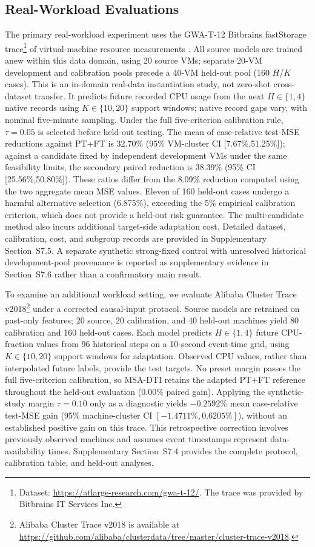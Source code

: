 \documentclass[a4paper,fleqn]{cas-sc}
\begin{document}
\subsection{Real-Workload Evaluations}
\label{subsec:external}

The primary real-workload experiment uses the GWA-T-12 Bitbrains
fastStorage trace\footnote{Dataset: \url{https://atlarge-research.com/gwa-t-12/}.
The trace was provided by Bitbrains IT Services Inc.}
of virtual-machine resource measurements \cite{ref37}.
All source models are trained anew within this data domain, using 20 source
VMs; separate 20-VM development and calibration pools precede a 40-VM
held-out pool (160 $H$/$K$ cases). This is an in-domain real-data
instantiation study, not zero-shot cross-dataset transfer. It predicts
future recorded CPU usage from the next $H\in\{1,4\}$ native records
using $K\in\{10,20\}$ support windows; native record gaps vary, with
nominal five-minute sampling. Under the full five-criterion calibration
rule, $\tau=0.05$ is selected before held-out testing. The mean of
case-relative test-MSE reductions against PT+FT is 32.70\%
(95\% VM-cluster CI [7.67\%,51.25\%]); against a candidate fixed by
independent development VMs under the same feasibility limits, the
secondary paired reduction is 38.39\% (95\% CI [25.56\%,50.80\%]).
These ratios differ from the 8.09\% reduction computed using the two
aggregate mean MSE values. Eleven of 160 held-out cases undergo a harmful
alternative selection (6.875\%), exceeding the 5\% empirical calibration
criterion, which does not provide a held-out risk guarantee.
The multi-candidate method also incurs additional target-side adaptation
cost. Detailed dataset, calibration, cost, and subgroup records are provided
in Supplementary Section~S7.5. A separate synthetic strong-fixed control
with unresolved historical development-pool provenance is reported as
supplementary evidence in Section~S7.6 rather than a confirmatory main result.

To examine an additional workload setting, we evaluate Alibaba Cluster
Trace v2018\footnote{Alibaba Cluster Trace v2018 is available at
\url{https://github.com/alibaba/clusterdata/tree/master/cluster-trace-v2018}.}
under a corrected causal-input protocol. Source models are retrained on
past-only features; 20 source, 20 calibration, and 40 held-out machines
yield 80 calibration and 160 held-out cases. Each model predicts $H\in\{1,4\}$ future CPU-fraction values
from 96 historical steps on a 10-second event-time grid, using
$K\in\{10,20\}$ support windows for adaptation. Observed CPU values,
rather than interpolated future labels, provide the test targets. No preset margin
passes the full five-criterion calibration, so MSA-DTI retains the
adapted PT+FT reference throughout the held-out evaluation (0.00\%
paired gain). Applying the synthetic-study margin $\tau=0.10$ only as
a diagnostic yields $-0.2592\%$ mean case-relative test-MSE gain
(95\% machine-cluster CI $[-1.4711\%,0.6205\%]$), without
an established positive gain on this trace. This retrospective correction involves
previously observed machines and assumes event timestamps represent
data-availability times. Supplementary Section~S7.4 provides the
complete protocol, calibration table, and held-out analyses.
\end{document}
